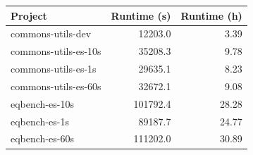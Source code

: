   \renewcommand{\theHreporttablerow}{tab-teralizer-runtimes.\arabic{reporttablerow}}
  \setcounter{reporttablerow}{0}
  \begin{tabular}{lrr}
  \toprule
  Project & Runtime (s) & Runtime (h) \\
  \midrule
  {reporttablerow}\label{tabrow:tab-teralizer-runtimes:commons-utils-dev}commons-utils-dev & 12203.0 & 3.39 \\
  {reporttablerow}\label{tabrow:tab-teralizer-runtimes:commons-utils-es-10s}commons-utils-es-10s & 35208.3 & 9.78 \\
  {reporttablerow}\label{tabrow:tab-teralizer-runtimes:commons-utils-es-1s}commons-utils-es-1s & 29635.1 & 8.23 \\
  {reporttablerow}\label{tabrow:tab-teralizer-runtimes:commons-utils-es-60s}commons-utils-es-60s & 32672.1 & 9.08 \\
  {reporttablerow}\label{tabrow:tab-teralizer-runtimes:eqbench-es-10s}eqbench-es-10s & 101792.4 & 28.28 \\
  {reporttablerow}\label{tabrow:tab-teralizer-runtimes:eqbench-es-1s}eqbench-es-1s & 89187.7 & 24.77 \\
  {reporttablerow}\label{tabrow:tab-teralizer-runtimes:eqbench-es-60s}eqbench-es-60s & 111202.0 & 30.89 \\
  \bottomrule
  \end{tabular}
